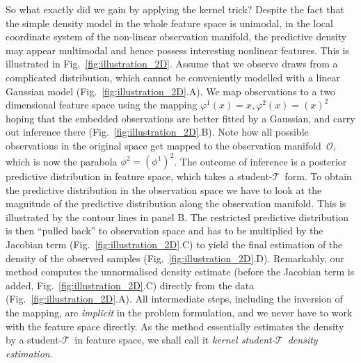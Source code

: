\documentclass[twoside]{article}
\newcommand{\studentt}{student-$\mathcal{T}$\ }
\begin{document}
\begin{figure*}
    \caption{
        \label{fig:illustration_2D}
        Illustration of kernel \studentt density estimation on a toy problem.
        \textbf{A,\ }Fourteen data points $x_{1:14}$ (\emph{crosses}) drawn from from a mixture distribution (\emph{solid curve}).
        \textbf{B,\ }Embedded observations $\bm{\phi}_{1:14}$(\emph{crosses}) in the two dimensional feature space and contours of the predictive density $q(\bm{\phi}_{15}\vert x_{1:14})$. The observation manifold is a parabola (\emph{solid curve}), and we are interested in the magnitude of the predictive distribution to this manifold (\emph{colouring}).
        \textbf{C,\ }The restricted posterior predictive distribution pulled back to the real line (\emph{solid curve}) gets multiplied by the Jacobian term $\sqrt{1 + 4x^2}$ (\emph{dotted curve}) to give
        \textbf{D,\ }the predictive distribution $q_{k}(x_{15}\vert x_{1:14})$ (\emph{solid curve}) in observation space.
         All distributions are scaled so that they normalise to one.}
\end{figure*}

So what exactly did we gain by applying the kernel trick? Despite the fact that the simple density model in the whole feature space is unimodal, in the local coordinate system of the non-linear observation manifold, the predictive density may appear multimodal and hence possess interesting nonlinear features. This is illustrated in Fig.~\ref{fig:illustration_2D}. Assume that we observe draws from a complicated distribution, which cannot be conveniently modelled with a linear Gaussian model (Fig.~\ref{fig:illustration_2D}.A). We map observations to a two dimensional feature space using the mapping $\varphi^1(x)=x,\varphi^2(x)=(x)^2$ hoping that the embedded observations are better fitted by a Gaussian, and carry out inference there (Fig.~\ref{fig:illustration_2D}.B). Note how all possible observations in the original space get mapped to the observation manifold~$\mathcal{O}$, which is now the parabola $\phi^2=(\phi^1)^2$. The outcome of inference is a posterior predictive distribution in feature space, which takes a \studentt form. To obtain the predictive distribution in the observation space we have to look at the magnitude of the predictive distribution along the observation manifold. This is illustrated by the contour lines in panel B. The restricted predictive distribution is then ``pulled back'' to observation space and has to be multiplied by the Jacobian term (Fig.~\ref{fig:illustration_2D}.C) to yield the final estimation of the density of the observed samples (Fig.~\ref{fig:illustration_2D}.D). Remarkably, our method computes the unnormalised density estimate (before the Jacobian term is added, Fig.~\ref{fig:illustration_2D}.C) directly from the data (Fig.~\ref{fig:illustration_2D}.A). All intermediate steps, including the inversion of the mapping, are \emph{implicit} in the problem formulation, and we never have to work with the feature space directly. As the method essentially estimates the density by a \studentt in feature space, we shall call it \emph{kernel \studentt density estimation}.
\end{document}
